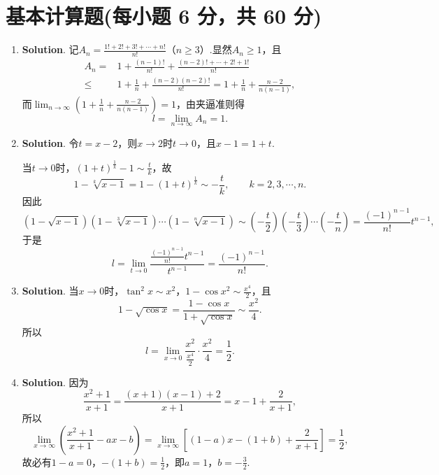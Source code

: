 \documentclass[../main.tex]{subfiles}
\begin{document}
\section{基本计算题(每小题 6 分，共 60 分)}
\begin{enumerate}
    \item \textbf{Solution}. 记$A_{n}=\frac{1!+2!+3!+\cdots+n!}{n!}$（$n\geq3$）.显然$A_{n}\geq1$，且
          \[
              \begin{aligned}
                  A_{n}= {} & 1+\frac{(n-1)!}{n!}+\frac{(n-2)!+\cdots+2!+1!}{n!}                     \\
                  \leq {}   & 1+\frac{1}{n}+\frac{(n-2)(n-2)!}{n!}=1+\frac{1}{n}+\frac{n-2}{n(n-1)},
              \end{aligned}
          \]
          而$\lim_{n\to\infty}\left(1+\frac{1}{n}+\frac{n-2}{n(n-1)}\right)=1$，由夹逼准则得
          \[
              l=\lim_{n\to\infty}A_{n}=1.
          \]

    \item \textbf{Solution}. 令$t=x-2$，则$x\to2$时$t\to0$，且$x-1=1+t$.

          当$t\to0$时，$(1+t)^{\frac{1}{k}}-1\sim\frac{t}{k}$，故
          \[
              1-\sqrt[k]{x-1}=1-(1+t)^{\frac{1}{k}}\sim-\frac{t}{k},\qquad k=2,3,\cdots,n.
          \]
          因此
          \[
              (1-\sqrt{x-1})(1-\sqrt[3]{x-1})\cdots(1-\sqrt[n]{x-1})
              \sim\left(-\frac{t}{2}\right)\left(-\frac{t}{3}\right)\cdots\left(-\frac{t}{n}\right)
              =\frac{(-1)^{n-1}}{n!}t^{n-1},
          \]
          于是
          \[
              l=\lim_{t\to0}\frac{\frac{(-1)^{n-1}}{n!}t^{n-1}}{t^{n-1}}=\frac{(-1)^{n-1}}{n!}.
          \]

    \item \textbf{Solution}. 当$x\to0$时，$\tan^{2}x\sim x^{2}$，$1-\cos x^{2}\sim\frac{x^{4}}{2}$，且
          \[
              1-\sqrt{\cos x}=\frac{1-\cos x}{1+\sqrt{\cos x}}\sim\frac{x^{2}}{4}.
          \]
          所以
          \[
              l=\lim_{x\to0}\frac{x^{2}}{\frac{x^{4}}{2}}\cdot\frac{x^{2}}{4}=\frac{1}{2}.
          \]

    \item \textbf{Solution}. 因为
          \[
              \frac{x^{2}+1}{x+1}=\frac{(x+1)(x-1)+2}{x+1}=x-1+\frac{2}{x+1},
          \]
          所以
          \[
              \lim_{x\to\infty}\left(\frac{x^{2}+1}{x+1}-ax-b\right)=\lim_{x\to\infty}\left[(1-a)x-(1+b)+\frac{2}{x+1}\right]=\frac{1}{2},
          \]
          故必有$1-a=0$，$-(1+b)=\frac{1}{2}$，即$a=1$，$b=-\frac{3}{2}$.


\end{enumerate}
\end{document}
